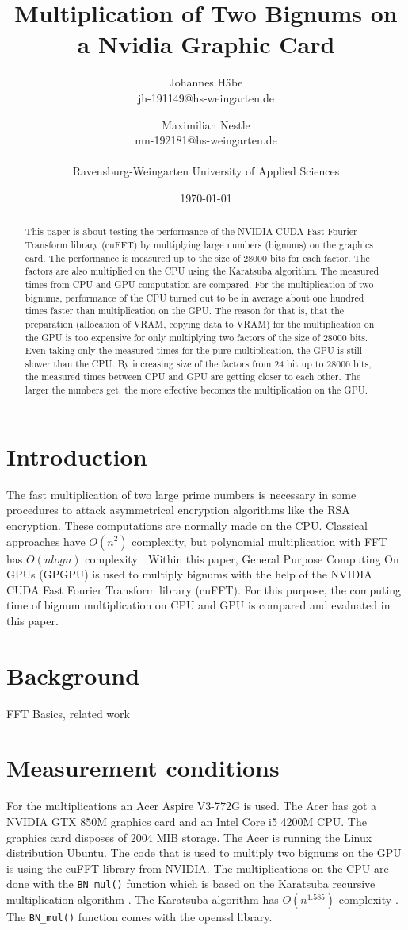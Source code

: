 \documentclass[12pt,a4paper]{article}
\title{Multiplication of Two Bignums on a Nvidia Graphic Card}
\author{Johannes H\"abe  \\
	jh-191149@hs-weingarten.de
	\and 
	Maximilian Nestle \\
	mn-192181@hs-weingarten.de \\\\
	Ravensburg-Weingarten University of Applied Sciences
	}
\date{\today}
\begin{document}
\maketitle
%
\begin{abstract}
This paper is about testing the performance of the NVIDIA CUDA Fast Fourier Transform library (cuFFT) by multiplying large numbers (bignums) on the graphics card. The performance is measured up to the size of 28000 bits for each factor. The factors are also multiplied on the CPU using the Karatsuba algorithm. The measured times from CPU and GPU computation are compared. For the multiplication of two bignums, performance of the CPU turned out to be in average about one hundred times faster than multiplication on the GPU. The reason for that is, that the preparation (allocation of VRAM, copying data to VRAM) for the multiplication on the GPU is too expensive for only multiplying two factors of the size of 28000 bits. Even taking only the measured times for the pure multiplication, the GPU is still slower than the CPU. By increasing size of the factors from 24 bit up to 28000 bits, the measured times between CPU and GPU are getting closer to each other. The larger the numbers get, the more effective becomes the multiplication on the GPU.
\end{abstract}

\section{Introduction}
The fast multiplication of two large prime numbers is necessary in some procedures to attack asymmetrical encryption algorithms like the RSA encryption. These computations are normally made on the CPU. Classical approaches have $O(n^2)$ complexity, but polynomial multiplication with FFT has $O(nlogn)$ complexity \cite{bantikyan2014big}. Within this paper, General Purpose Computing On GPUs (GPGPU) is used to multiply bignums with the help of the NVIDIA CUDA Fast Fourier Transform library (cuFFT). For this purpose, the computing time of bignum multiplication on CPU and GPU is compared and evaluated in this paper.

\section{Background}
FFT Basics, related work

\section{Measurement conditions}
For the multiplications an Acer Aspire V3-772G is used. The Acer has got a NVIDIA GTX 850M graphics card and an Intel Core i5 4200M CPU. The graphics card disposes of 2004 MIB storage. The Acer is running the Linux distribution Ubuntu. The code that is used to multiply two bignums on the GPU is using the cuFFT library from NVIDIA. The multiplications on the CPU are done with the \texttt{BN_mul()} function which is based on the Karatsuba recursive multiplication algorithm \cite{young1995bnmul}. The Karatsuba algorithm has $O(n^{1.585})$ complexity \cite{dietzfelbinger2012eff}. The \texttt{BN_mul()} function comes with the openssl library.
\end{document}
